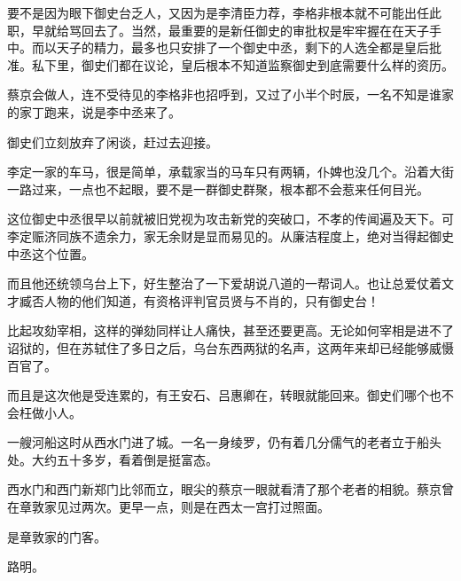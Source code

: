 要不是因为眼下御史台乏人，又因为是李清臣力荐，李格非根本就不可能出任此职，早就给骂回去了。当然，最重要的是新任御史的审批权是牢牢握在在天子手中。而以天子的精力，最多也只安排了一个御史中丞，剩下的人选全都是皇后批准。私下里，御史们都在议论，皇后根本不知道监察御史到底需要什么样的资历。 

蔡京会做人，连不受待见的李格非也招呼到，又过了小半个时辰，一名不知是谁家的家丁跑来，说是李中丞来了。 

御史们立刻放弃了闲谈，赶过去迎接。 

李定一家的车马，很是简单，承载家当的马车只有两辆，仆婢也没几个。沿着大街一路过来，一点也不起眼，要不是一群御史群聚，根本都不会惹来任何目光。 

这位御史中丞很早以前就被旧党视为攻击新党的突破口，不孝的传闻遍及天下。可李定赈济同族不遗余力，家无余财是显而易见的。从廉洁程度上，绝对当得起御史中丞这个位置。 

而且他还统领乌台上下，好生整治了一下爱胡说八道的一帮词人。也让总爱仗着文才臧否人物的他们知道，有资格评判官员贤与不肖的，只有御史台！ 

比起攻劾宰相，这样的弹劾同样让人痛快，甚至还要更高。无论如何宰相是进不了诏狱的，但在苏轼住了多日之后，乌台东西两狱的名声，这两年来却已经能够威慑百官了。 

而且是这次他是受连累的，有王安石、吕惠卿在，转眼就能回来。御史们哪个也不会枉做小人。 

一艘河船这时从西水门进了城。一名一身绫罗，仍有着几分儒气的老者立于船头处。大约五十多岁，看着倒是挺富态。 

西水门和西门新郑门比邻而立，眼尖的蔡京一眼就看清了那个老者的相貌。蔡京曾在章敦家见过两次。更早一点，则是在西太一宫打过照面。 

是章敦家的门客。 

路明。 

